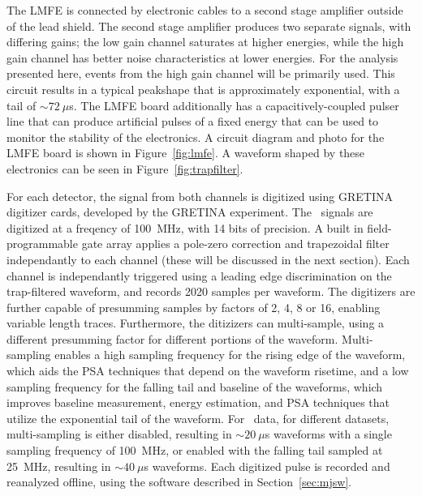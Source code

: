 \documentclass[/main.tex]{subfiles}
\begin{document}
The LMFE is connected by electronic cables to a second stage amplifier outside of the lead shield.
The second stage amplifier produces two separate signals, with differing gains; the low gain channel saturates at higher energies, while the high gain channel has better noise characteristics at lower energies.
For the analysis presented here, events from the high gain channel will be primarily used.
This circuit results in a typical peakshape that is approximately exponential, with a tail of $\sim72~\mu$s.
The LMFE board additionally has a capacitively-coupled pulser line that can produce artificial pulses of a fixed energy that can be used to monitor the stability of the electronics.
A circuit diagram and photo for the LMFE board is shown in Figure~\ref{fig:lmfe}.
A waveform shaped by these electronics can be seen in Figure~\ref{fig:trapfilter}.

For each detector, the signal from both channels is digitized using GRETINA digitizer cards, developed by the GRETINA experiment\cite{zimmermann2012}.
The \MJD\ signals are digitized at a freqency of 100~MHz, with 14 bits of precision.
A built in field-programmable gate array applies a pole-zero correction and trapezoidal filter independantly to each channel (these will be discussed in the next section).
Each channel is independantly triggered using a leading edge discrimination on the trap-filtered waveform, and records 2020 samples per waveform.
The digitizers are further capable of presumming samples by factors of 2, 4, 8 or 16, enabling variable length traces.
Furthermore, the ditizizers can multi-sample, using a different presumming factor for different portions of the waveform.
Multi-sampling enables a high sampling frequency for the rising edge of the waveform, which aids the PSA techniques that depend on the waveform risetime, and a low sampling frequency for the falling tail and baseline of the waveforms, which improves baseline measurement, energy estimation, and PSA techniques that utilize the exponential tail of the waveform.
For \MJD\ data, for different datasets, multi-sampling is either disabled, resulting in $\sim20~\mu$s waveforms with a single sampling frequency of 100~MHz, or enabled with the falling tail sampled at 25~MHz, resulting in $\sim40~\mu$s waveforms.
Each digitized pulse is recorded and reanalyzed offline, using the software described in Section~\ref{sec:mjsw}.
\end{document}
